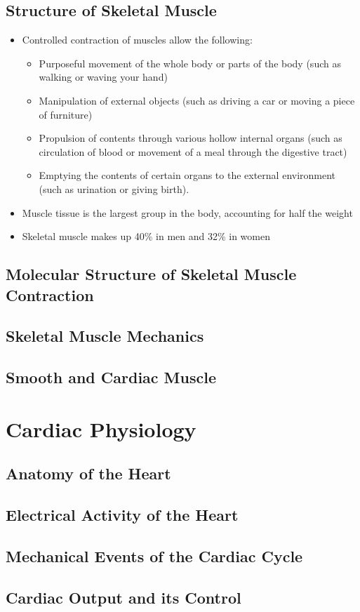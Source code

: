 \documentclass[11pt]{article}
\begin{document}
\subsection{Structure of Skeletal Muscle}
\begin{itemize}
\item Controlled contraction of muscles allow the following:
\begin{itemize}
\item Purposeful movement of the whole body or parts of the body (such as walking or waving your hand)
\item Manipulation of external objects (such as driving a car or moving a piece of furniture)
\item Propulsion of contents through various hollow internal organs (such as circulation of blood or movement of a meal through the digestive tract)
\item Emptying the contents of certain organs to the external environment (such as urination or giving birth).
\end{itemize}
\item Muscle tissue is the largest group in the body, accounting for half the weight
\item Skeletal muscle makes up 40\% in men and 32\% in women 
\end{itemize}
\subsection{Molecular Structure of Skeletal Muscle Contraction}
\subsection{Skeletal Muscle Mechanics}
\subsection{Smooth and Cardiac Muscle}

\section{Cardiac Physiology}

\subsection{Anatomy of the Heart}
\subsection{Electrical Activity of the Heart}
\subsection{Mechanical Events of the Cardiac Cycle}
\subsection{Cardiac Output and its Control}
\end{document}
